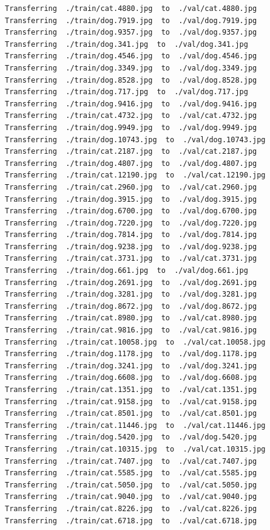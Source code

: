 \documentclass[]{book}
\theoremstyle{definition}
\theoremstyle{definition}
\theoremstyle{definition}
\theoremstyle{remark}
\begin{document}
\begin{verbatim}
Transferring  ./train/cat.4880.jpg  to  ./val/cat.4880.jpg
Transferring  ./train/dog.7919.jpg  to  ./val/dog.7919.jpg
Transferring  ./train/dog.9357.jpg  to  ./val/dog.9357.jpg
Transferring  ./train/dog.341.jpg  to  ./val/dog.341.jpg
Transferring  ./train/dog.4546.jpg  to  ./val/dog.4546.jpg
Transferring  ./train/dog.3349.jpg  to  ./val/dog.3349.jpg
Transferring  ./train/dog.8528.jpg  to  ./val/dog.8528.jpg
Transferring  ./train/dog.717.jpg  to  ./val/dog.717.jpg
Transferring  ./train/dog.9416.jpg  to  ./val/dog.9416.jpg
Transferring  ./train/cat.4732.jpg  to  ./val/cat.4732.jpg
Transferring  ./train/dog.9949.jpg  to  ./val/dog.9949.jpg
Transferring  ./train/dog.10743.jpg  to  ./val/dog.10743.jpg
Transferring  ./train/cat.2187.jpg  to  ./val/cat.2187.jpg
Transferring  ./train/dog.4807.jpg  to  ./val/dog.4807.jpg
Transferring  ./train/cat.12190.jpg  to  ./val/cat.12190.jpg
Transferring  ./train/cat.2960.jpg  to  ./val/cat.2960.jpg
Transferring  ./train/dog.3915.jpg  to  ./val/dog.3915.jpg
Transferring  ./train/dog.6700.jpg  to  ./val/dog.6700.jpg
Transferring  ./train/dog.7220.jpg  to  ./val/dog.7220.jpg
Transferring  ./train/dog.7814.jpg  to  ./val/dog.7814.jpg
Transferring  ./train/dog.9238.jpg  to  ./val/dog.9238.jpg
Transferring  ./train/cat.3731.jpg  to  ./val/cat.3731.jpg
Transferring  ./train/dog.661.jpg  to  ./val/dog.661.jpg
Transferring  ./train/dog.2691.jpg  to  ./val/dog.2691.jpg
Transferring  ./train/dog.3281.jpg  to  ./val/dog.3281.jpg
Transferring  ./train/dog.8672.jpg  to  ./val/dog.8672.jpg
Transferring  ./train/cat.8980.jpg  to  ./val/cat.8980.jpg
Transferring  ./train/cat.9816.jpg  to  ./val/cat.9816.jpg
Transferring  ./train/cat.10058.jpg  to  ./val/cat.10058.jpg
Transferring  ./train/dog.1178.jpg  to  ./val/dog.1178.jpg
Transferring  ./train/dog.3241.jpg  to  ./val/dog.3241.jpg
Transferring  ./train/dog.6608.jpg  to  ./val/dog.6608.jpg
Transferring  ./train/cat.1351.jpg  to  ./val/cat.1351.jpg
Transferring  ./train/cat.9158.jpg  to  ./val/cat.9158.jpg
Transferring  ./train/cat.8501.jpg  to  ./val/cat.8501.jpg
Transferring  ./train/cat.11446.jpg  to  ./val/cat.11446.jpg
Transferring  ./train/dog.5420.jpg  to  ./val/dog.5420.jpg
Transferring  ./train/cat.10315.jpg  to  ./val/cat.10315.jpg
Transferring  ./train/cat.7407.jpg  to  ./val/cat.7407.jpg
Transferring  ./train/cat.5585.jpg  to  ./val/cat.5585.jpg
Transferring  ./train/cat.5050.jpg  to  ./val/cat.5050.jpg
Transferring  ./train/cat.9040.jpg  to  ./val/cat.9040.jpg
Transferring  ./train/cat.8226.jpg  to  ./val/cat.8226.jpg
Transferring  ./train/cat.6718.jpg  to  ./val/cat.6718.jpg

\end{verbatim}
\end{document}

